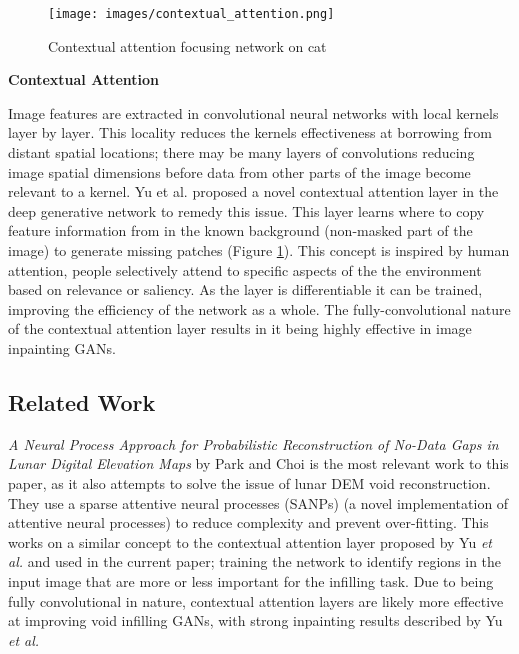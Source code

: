 \documentclass[twocolumn]{article}
\begin{document}
\begin{figure}[htbp]
\centering
\texttt{[image: images/contextual\_attention.png]}
\caption{\label{fig:contextual_attention}Contextual attention focusing network on cat \autocite{zhangAgileAmuletRealTime2018}}
\end{figure}

\textbf{Contextual Attention}

Image features are extracted in convolutional neural networks with local kernels layer by layer.
This locality reduces the kernels effectiveness at borrowing from distant spatial locations; there may be many layers of convolutions reducing image spatial dimensions before data from other parts of the image become relevant to a kernel.
Yu et al.\autocite{yuGenerativeImageInpainting2018} proposed a novel contextual attention layer in the deep generative network to remedy this issue.
This layer learns where to copy feature information from in the known background (non-masked part of the image) to generate missing patches (Figure \ref{fig:contextual_attention}).
This concept is inspired by human attention, people selectively attend to specific aspects of the the environment based on relevance or saliency.
As the layer is differentiable it can be trained, improving the efficiency of the network as a whole.
The fully-convolutional nature of the contextual attention layer results in it being highly effective in image inpainting GANs.

\subsection{Related Work}
\label{sec:org634d7a3}

\emph{A Neural Process Approach for Probabilistic Reconstruction of No-Data Gaps in Lunar Digital Elevation Maps} by Park and Choi\autocite{parkNeuralProcessApproach2021} is the most relevant work to this paper, as it also attempts to solve the issue of lunar DEM void reconstruction.
They use a sparse attentive neural processes (SANPs) (a novel implementation of attentive neural processes\autocite{kimAttentiveNeuralProcesses2019}) to reduce complexity and prevent over-fitting.
This works on a similar concept to the contextual attention layer proposed by Yu \emph{et al.}\autocite{yuGenerativeImageInpainting2018} and used in the current paper; training the network to identify regions in the input image that are more or less important for the infilling task.
Due to being fully convolutional in nature, contextual attention layers are likely more effective at improving void infilling GANs, with strong inpainting results described by Yu \emph{et al.}
\end{document}
